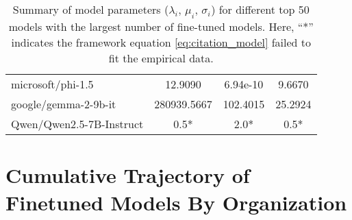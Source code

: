\documentclass{article} %
\begin{document}
\begin{table}[ht]
{\begin{tabular}{lccc}
        microsoft/phi-1.5 & 12.9090 & 6.94e-10 & 9.6670 \\
        google/gemma-2-9b-it & 280939.5667 & 102.4015 & 25.2924 \\
        Qwen/Qwen2.5-7B-Instruct & 0.5* & 2.0* & 0.5* \\
        \bottomrule
    \end{tabular}
    }
    \caption{Summary of model parameters ($\lambda_i$, $\mu_i$, $\sigma_i$) for different top 50 models with the largest number of fine-tuned models. Here, ``*'' indicates the framework equation \ref{eq:citation_model} failed to fit the empirical data.}
    \label{tab:model_parameter_summary}
\end{table}

\section{Cumulative Trajectory of Finetuned Models By Organization} \label{sec:individual_cummulative_citation}
\end{document}

